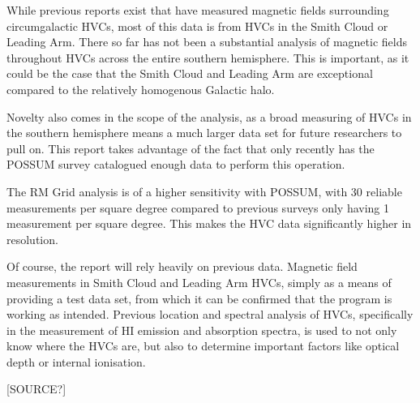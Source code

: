 While previous reports exist that have measured magnetic fields surrounding circumgalactic HVCs, most of this data is from HVCs in the Smith Cloud or Leading Arm. There so far has not been a substantial analysis of magnetic fields throughout HVCs across the entire southern hemisphere. This is important, as it could be the case that the Smith Cloud and Leading Arm are exceptional compared to the relatively homogenous Galactic halo.

Novelty also comes in the scope of the analysis, as a broad measuring of HVCs in the southern hemisphere means a much larger data set for future researchers to pull on. This report takes advantage of the fact that only recently has the POSSUM survey catalogued enough data to perform this operation.

The RM Grid analysis is of a higher sensitivity with POSSUM, with 30 reliable measurements per square degree compared to previous surveys only having 1 measurement per square degree. This makes the HVC data significantly higher in resolution.

Of course, the report will rely heavily on previous data. Magnetic field measurements in Smith Cloud and Leading Arm HVCs, simply as a means of providing a test data set, from which it can be confirmed that the program is working as intended. Previous location and spectral analysis of HVCs, specifically in the measurement of HI emission and absorption spectra, is used to not only know where the HVCs are, but also to determine important factors like optical depth or internal ionisation.

[SOURCE?]

